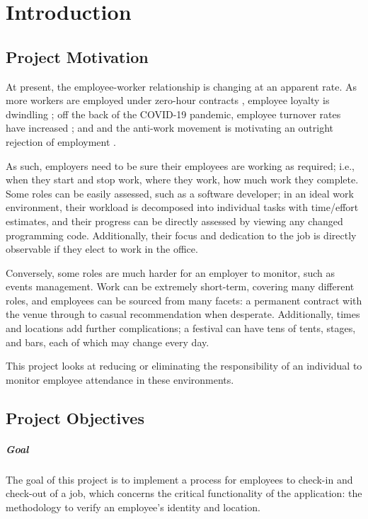 \chapter{Introduction}

\section{Project Motivation}

At present, the employee-worker relationship is changing at
an apparent rate.
As more workers are employed under zero-hour contracts
\parencite{zeroHourContractsStats}, employee loyalty is
dwindling \parencite{zeroHourContractsLoyalty}; off the
back of the COVID-19 pandemic, employee turnover rates have
increased \parencite{employeeTurnover}; and and the
anti-work movement is motivating an outright rejection of
employment \parencite{antiWorkMovement}.

As such, employers need to be sure their employees are
working as required; i.e., when they start and stop work,
where they work, how much work they complete.
Some roles can be easily assessed, such as a software
developer; in an ideal work environment, their workload is
decomposed into individual tasks with time/effort
estimates, and their progress can be directly assessed by
viewing any changed programming code.
Additionally, their focus and dedication to the job is
directly observable if they elect to work in the office.

Conversely, some roles are much harder for an employer to
monitor, such as events management.
Work can be extremely short-term, covering many different
roles, and employees can be sourced from many facets: a
permanent contract with the venue through to casual
recommendation when desperate.
Additionally, times and locations add further
complications; a festival can have tens of tents, stages,
and bars, each of which may change every day.

This project looks at  reducing or eliminating the
responsibility of an individual to  monitor employee
attendance in these environments.

\section{Project Objectives}

\paragraph{Goal}
The goal of this project is to implement a process for
employees to \gls{check-in} and \gls{check-out} of a job,
which concerns the critical functionality of the
application: the methodology to verify an employee's
identity and location. 

